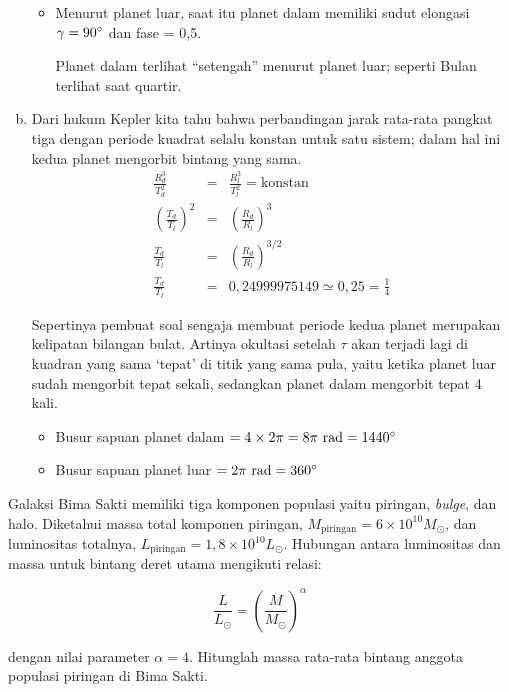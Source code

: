 \documentclass[11pt,fleqn]{exam}
\begin{document}
\begin{questions}
\begin{enumerate}[a)]
\begin{itemize}
\item Menurut planet luar, saat itu planet dalam memiliki sudut elongasi $\gamma = 90\degree$ dan fase = 0,5. 

Planet dalam terlihat ``setengah'' menurut planet luar; seperti Bulan terlihat saat quartir.
\end{itemize}

\item Dari hukum Kepler kita tahu bahwa perbandingan jarak rata-rata pangkat tiga dengan periode kuadrat selalu konstan untuk satu sistem; dalam hal ini kedua planet mengorbit bintang yang sama.
\begin{eqnarray*}
\frac{R_d^3}{T_d^2} &=& \frac{R_l^3}{T_l^2} = \text{konstan} \\
\left(\frac{T_d}{T_l}\right)^2 &=& \left(\frac{R_d}{R_l}\right)^3 \\
\frac{T_d}{T_l} &=& \left(\frac{R_d}{R_l}\right)^{3/2} \\
\frac{T_d}{T_l} &=& 0,24999975149 \simeq 0,25 = \frac{1}{4}
\end{eqnarray*}

Sepertinya pembuat soal sengaja membuat periode kedua planet merupakan kelipatan bilangan bulat. Artinya okultasi setelah $\tau$ akan terjadi lagi di kuadran yang sama `tepat' di titik yang sama pula, yaitu ketika planet luar sudah mengorbit tepat sekali, sedangkan planet dalam mengorbit tepat 4 kali. 
\begin{itemize}
\item Busur sapuan planet dalam $= 4 \times 2\pi = 8\pi \text{  rad} = 1440\degree$
\item Busur sapuan planet luar $= 2\pi \text{  rad} = 360\degree$
\end{itemize}


\end{enumerate}


\vspace{0.3cm}
\question Galaksi Bima Sakti memiliki tiga komponen populasi yaitu piringan, \textit{bulge}, dan halo. Diketahui massa total komponen piringan, $M_{\text{piringan}}= 6\times 10^{10} M_{\odot}$, dan luminositas totalnya, $L_{\text{piringan}}= 1,8\times 10^{10} L_{\odot}$. Hubungan antara luminositas dan massa untuk bintang deret utama mengikuti relasi:

$$\frac{L}{L_{\odot}} = \left( \frac{M}{M_{\odot}}\right)^\alpha$$

dengan nilai parameter $\alpha=4$. Hitunglah massa rata-rata bintang anggota populasi piringan di Bima Sakti.\\



\end{questions}
\end{document}
